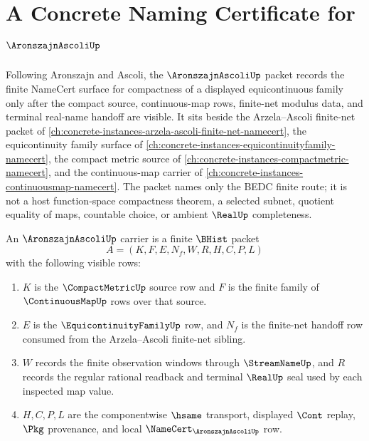 \chapter{A Concrete Naming Certificate for $\AronszajnAscoliUp$}
\label{ch:concrete-instances-aronszajn-ascoli-namecert}

Following Aronszajn and Ascoli, the $\AronszajnAscoliUp$ packet records the finite NameCert surface for compactness of a displayed equicontinuous family only after the compact source, continuous-map rows, finite-net modulus data, and terminal real-name handoff are visible. It sits beside the Arzela--Ascoli finite-net packet of \autoref{ch:concrete-instances-arzela-ascoli-finite-net-namecert}, the equicontinuity family surface of \autoref{ch:concrete-instances-equicontinuityfamily-namecert}, the compact metric source of \autoref{ch:concrete-instances-compactmetric-namecert}, and the continuous-map carrier of \autoref{ch:concrete-instances-continuousmap-namecert}. The packet names only the BEDC finite route; it is not a host function-space compactness theorem, a selected subnet, quotient equality of maps, countable choice, or ambient $\RealUp$ completeness.

\begin{definition}
\label{def:aronszajn-ascoli-carrier}
An $\AronszajnAscoliUp$ carrier is a finite $\BHist$ packet
$$
A=(K,F,E,N_f,W,R,H,C,P,L)
$$
with the following visible rows:
\begin{enumerate}
\item $K$ is the $\CompactMetricUp$ source row and $F$ is the finite family of $\ContinuousMapUp$ rows over that source.
\item $E$ is the $\EquicontinuityFamilyUp$ row, and $N_f$ is the finite-net handoff row consumed from the Arzela--Ascoli finite-net sibling.
\item $W$ records the finite observation windows through $\StreamNameUp$, and $R$ records the regular rational readback and terminal $\RealUp$ seal used by each inspected map value.
\item $H,C,P,L$ are the componentwise $\hsame$ transport, displayed $\Cont$ replay, $\Pkg$ provenance, and local $\NameCert_{\AronszajnAscoliUp}$ row.
\end{enumerate}
\end{definition}

